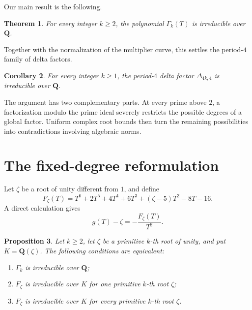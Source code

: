 \documentclass[11pt]{article}
\newtheorem{theorem}{Theorem}[section]
\newtheorem{proposition}[theorem]{Proposition}
\newtheorem{corollary}[theorem]{Corollary}
\newcommand{\Q}{\mathbf Q}
\begin{document}
Our main result is the following.

\begin{theorem}\label{thm:main}
For every integer $k\geq2$, the polynomial $\Gamma_k(T)$ is irreducible
over $\Q$.
\end{theorem}

Together with the normalization of the multiplier curve, this settles
the period-$4$ family of delta factors.

\begin{corollary}\label{cor:delta-main}
For every integer $k\geq1$, the period-$4$ delta factor
$\Delta_{4k,4}$ is irreducible over $\Q$.
\end{corollary}

The argument has two complementary parts.  At every prime above $2$, a
factorization modulo the prime ideal severely restricts the possible
degrees of a global factor.  Uniform complex root bounds then turn the
remaining possibilities into contradictions involving algebraic norms.

\section{The fixed-degree reformulation}

Let $\zeta$ be a root of unity different from $1$, and define
\begin{equation}\label{eq:Fzeta}
 F_\zeta(T)=T^6+2T^5+4T^4+6T^3+(\zeta-5)T^2-8T-16.
\end{equation}
A direct calculation gives
\begin{equation}\label{eq:g-F}
 g(T)-\zeta=-\frac{F_\zeta(T)}{T^2}.
\end{equation}

\begin{proposition}\label{prop:equivalence}
Let $k\geq2$, let $\zeta$ be a primitive $k$-th root of unity, and put
$K=\Q(\zeta)$.  The following conditions are equivalent:
\begin{enumerate}[label=\textup{(\Alph*)}]
 \item $\Gamma_k$ is irreducible over $\Q$;
 \item $F_\zeta$ is irreducible over $K$ for one primitive $k$-th root
       $\zeta$;
 \item $F_\zeta$ is irreducible over $K$ for every primitive $k$-th root
       $\zeta$.
\end{enumerate}
\end{proposition}
\end{document}
